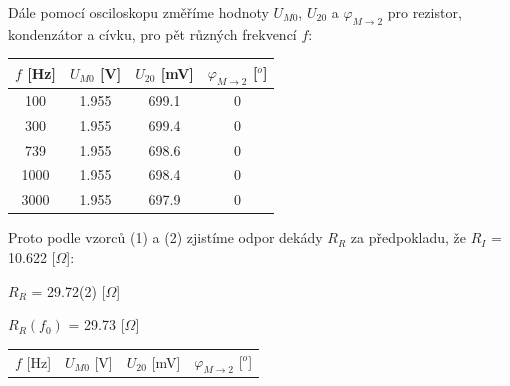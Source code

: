 \documentclass[a4paper,11pt]{article}
\begin{document}
\hspace{10pt}  
\begin{minipage}[t]{0.5\textwidth} 
            \vspace{-110pt}
            Dále pomocí osciloskopu změříme hodnoty $U_{M0}$, $U_{20}$ a $\varphi_{M\rightarrow 2}$ pro rezistor, kondenzátor a cívku, pro pět různých frekvencí $f$: 
            \vspace{10pt}
            \par \centering
            \begin{tabular}{|c|c|c|c|}
                    \hline
                    $f$ [Hz] & $U_{M0}$ [V] & $U_{20}$ [mV] & $\varphi_{M\rightarrow 2}$ [$^o$] \\
                    \hline
                    100 & 1.955 & 699.1 & 0 \\
                    \hline
                    300 & 1.955 & 699.4 & 0 \\
                    \hline
                    739 & 1.955 & 698.6 & 0 \\
                    \hline
                    1000 & 1.955 & 698.4 & 0 \\
                    \hline
                    3000 & 1.955 & 697.9 & 0 \\
                    \hline
                \end{tabular}
                \captionsetup{justification=centering, font=footnotesize}
                \vspace{20pt}
                \raggedright
                \par Proto podle vzorců (1) a (2) zjistíme odpor dekády $R_R$ za předpokladu, že $R_I$ = 10.622 [$\Omega$]:
                \begin{center}
                    $R_R$ = 29.72(2) [$\Omega$]
                    \vspace{5pt}
                    \par $R_R(f_0)$ = 29.73 [$\Omega$]
                \end{center}
                \vspace{10pt}
                \par \centering
                \begin{tabular}{|c|c|c|c|}
                    \hline
                    $f$ [Hz] & $U_{M0}$ [V] & $U_{20}$ [mV] & $\varphi_{M\rightarrow 2}$ [$^o$] \\

\end{tabular}
\end{minipage}
\end{document}
